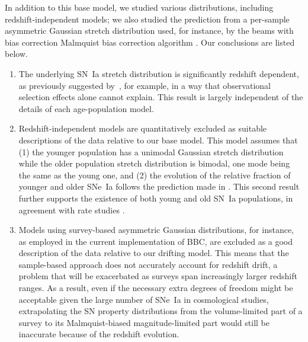 \documentclass[]{aa}
\begin{document}
In addition to this base model, we studied various
distributions, including redshift-independent models; we also studied the
prediction from a per-sample asymmetric Gaussian stretch distribution used, for
instance, by the beams with bias correction Malmquist bias correction algorithm
\citep{scolnic2016, kessler2017}.
Our conclusions are listed below.
\begin{enumerate}

    \item The underlying SN~Ia stretch distribution is significantly redshift
        dependent, as previously suggested by~\cite{howell2007}, for example, in
        a way that observational selection effects alone cannot explain. This
        result is largely independent of the details of each age-population model.
    
    \item Redshift-independent models are quantitatively excluded as
        suitable descriptions of the data relative to our base model. This model
        assumes that (1) the younger population has a unimodal Gaussian stretch
        distribution while the older population stretch distribution is
        bimodal, one mode being the same as the young one, and (2) the evolution of
        the relative fraction of younger and older SNe~Ia follows the prediction
        made in \cite{rigault2020}. This second result further supports
        the existence of both young and old SN~Ia populations, in agreement with
        rate studies \citep{mannucci2005, scannapieco2005, sullivan2006,
        aubourg2008}. 
        
    \item Models using survey-based asymmetric Gaussian distributions,
        for instance, as employed in the current implementation of BBC, are
        excluded as a good description of the data relative to our
        drifting model. This means that the sample-based approach does not accurately
        account for redshift drift, a problem that will be exacerbated
        as surveys span increasingly larger redshift ranges. As a
    result, even if the necessary extra degrees of freedom might be acceptable
    given the large number of SNe~Ia in cosmological studies, extrapolating the
    SN property distributions from the volume-limited part of a survey to its
    Malmquist-biased magnitude-limited part would still be inaccurate
    because of the redshift evolution.


\end{enumerate}
\end{document}

